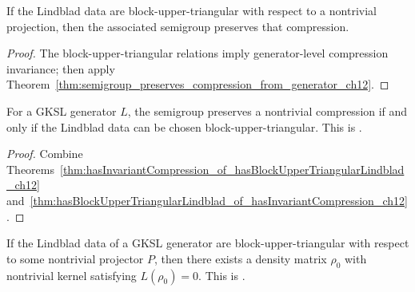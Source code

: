 \begin{theorem}
    \label{thm:hasInvariantCompression_of_hasBlockUpperTriangularLindblad_ch12}
    \leanok
    If the Lindblad data are block-upper-triangular with respect to a nontrivial projection,
    then the associated semigroup preserves that compression.
\end{theorem}

\begin{proof}
    \leanok
    The block-upper-triangular relations imply generator-level compression invariance; then apply
    Theorem~\ref{thm:semigroup_preserves_compression_from_generator_ch12}.
\end{proof}

\begin{theorem}
    \label{thm:wolf_prop_7_6_three_iff_four}
    \leanok
    For a GKSL generator $L$, the semigroup preserves a nontrivial
    compression if and only if the Lindblad data can be chosen
    block-upper-triangular.
    This is \cite[Proposition~7.6, (3)$\Leftrightarrow$(4)]{Wolf2012Quantum}.
\end{theorem}

\begin{proof}\leanok
    Combine Theorems~\ref{thm:hasInvariantCompression_of_hasBlockUpperTriangularLindblad_ch12}
    and~\ref{thm:hasBlockUpperTriangularLindblad_of_hasInvariantCompression_ch12}.
\end{proof}

\begin{theorem}
    \label{thm:blockUpperTriangular_implies_rankDeficient}
    \leanok
    If the Lindblad data of a GKSL generator are block-upper-triangular
    with respect to some nontrivial projector $P$,
    then there exists a density matrix $\rho_0$ with nontrivial kernel
    satisfying $L(\rho_0) = 0$.
    This is \cite[Proposition~7.6, (4)$\Rightarrow$(2)]{Wolf2012Quantum}.
\end{theorem}

